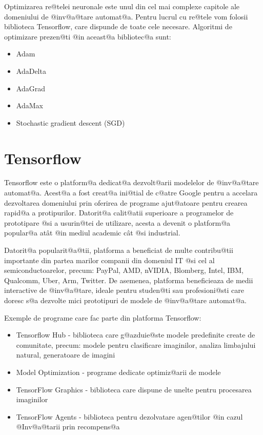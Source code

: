 Optimizarea re@telei neuronale este unul din cel mai complexe capitole ale domeniului de @inv@a@tare automat@a. Pentru lucrul cu re@tele vom folosii biblioteca Tensorflow, care dispunde de toate cele necesare. Algoritmi de optimizare prezen@ti @in aceast@a bibliotec@a sunt:

\begin{itemize}
	\item Adam
	\item AdaDelta
	\item AdaGrad
	\item AdaMax
	\item Stochastic gradient descent (SGD)
\end{itemize} 

\section{Tensorflow}
Tensorflow este o platform@a dedicat@a dezvolt@arii modelelor de @inv@a@tare automat@a. Acest@a a fost creat@a ini@tial de c@atre Google pentru a accelara dezvoltarea domeniului prin oferirea de programe ajut@atoare pentru crearea rapid@a a protipurilor. Datorit@a calit@atii superioare a programelor de prototipare @si a usurin@tei de utilizare, acesta a devenit o platform@a popular@a at\^ at @in mediul academic c\^ at @si industrial.

Datorit@a popularit@a@tii, platforma a beneficiat de multe contribu@tii importante din partea marilor companii din domeniul IT @si cel al semiconductoarelor, precum: PayPal, AMD, nVIDIA, Blomberg, Intel, IBM, Qualcomm, Uber, Arm, Twitter. De asemenea, platforma beneficieaza de medii interactive de @inv@a@tare, ideale pentru studen@ti sau profesioni@sti care doresc s@a dezvolte mici prototipuri de modele de @inv@a@tare automat@a.

Exemple de programe care fac parte din platforma Tensorflow:
\begin{itemize}
	\item Tensorflow Hub - biblioteca care g@azduie@ste modele predefinite create de comunitate, precum: modele pentru clasificare imaginilor, analiza limbajului natural, generatoare de imagini
	\item Model Optimization - programe dedicate optimiz@arii de modele
	\item TensorFlow Graphics - biblioteca care dispune de unelte pentru procesarea imaginilor
	\item TensorFlow Agents - biblioteca pentru dezolvatare agen@tilor @in cazul @Inv@a@tarii prin recompens@a
\end{itemize}

